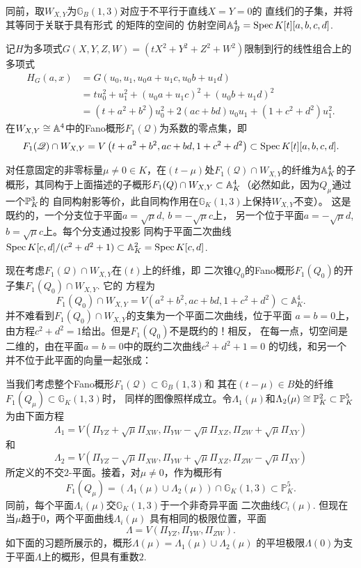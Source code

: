 同前，取$W_{X,Y}$为$\mathbb G_{B}(1,3)$对应于不平行于直线$X=Y=0$的
直线们的子集，并将其等同于关联于具有形式 \theequation 的矩阵的空间的
仿射空间$\A_B^4=\spec K[t][a,b,c,d]$.

记$H$为多项式$G(X,Y,Z,W)=(tX^2+Y^2+Z^2+W^2)$限制到行的线性组合上的
多项式
\[
\begin{aligned} 
	H_{G}(a, x) &=G\left(u_{0}, u_{1}, u_{0} a+u_{1} c, u_{0} b+u_{1} d\right) \\ &=t u_{0}^{2}+u_{1}^{2}+\left(u_{0} a+u_{1} c\right)^{2}+\left(u_{0} b+u_{1} d\right)^{2} \\ &=\left(t+a^{2}+b^{2}\right) u_{0}^{2}+2(a c+b d) u_{0} u_{1}+\left(1+c^{2}+d^{2}\right) u_{1}^{2}. 
\end{aligned}
\]
在$W_{X,Y}\cong \A^4$中的Fano概形$F_1(\mathscr Q)$为系数的零点集，即
\[
	F_{1}(\mathscr{Q}) \cap W_{X, Y}=V\left(t+a^{2}+b^{2}, a c+b d, 1+c^{2}+d^{2}\right) \subset \spec K[t][a, b, c, d].
\]


对任意固定的非零标量$\mu\neq 0\in K$，在$(t-\mu)$处$F_1(\mathscr Q)
\cap W_{X,Y}$的纤维为$\A_K^4$的子概形，其同构于上面描述的子概形$F_1(Q)
\cap W_{X,Y}\subset \A_K^4$（必然如此，因为$Q_\mu$通过一个$\P_K^3$的
自同构射影等价，此自同构作用在$\mathbb G_K(1,3)$上保持$W_{X,Y}$不变）。
这是既约的，一个分支位于平面$a=\sqrt{\mu}d$, $b=-\sqrt{\mu}c$上，
另一个位于平面$a=-\sqrt{\mu}d$, $b=\sqrt{\mu}c$上。每个分支通过投影
同构于平面二次曲线$\spec K[c,d]/(c^2+d^2+1)\subset \A_K^2=\spec K[c,d]$.

现在考虑$F_1(\mathscr Q)\cap W_{X,Y}$在$(t)$上的纤维，即
二次锥$Q_0$的Fano概形$F_1(Q_0)$的开子集$F_1(Q_0)\cap W_{X,Y}$. 它的
方程为
\[
	F_{1}\left(Q_{0}\right) \cap W_{X, Y}=V\left(a^{2}+b^{2}, a c+b d, 1+c^{2}+d^{2}\right) \subset \mathbb{A}_{K}^{4}.
\]
并不难看到$F_1(Q_0)\cap W_{X,Y}$的支集为一个平面二次曲线，位于平面
$a=b=0$上，由方程$c^2+d^2=1$给出。但是$F_1(Q_0)$不是既约的！相反，
在每一点，切空间是二维的，由在平面$a=b=0$中的既约二次曲线$c^2+d^2+1=0$
的切线，和另一个并不位于此平面的向量一起张成：

当我们考虑整个Fano概形$F_1(\mathscr Q)\subset \mathbb G_B(1,3)$和
其在$(t-\mu)\in B$处的纤维$F_1(Q_\mu)\subset \mathbb G_K(1,3)$时，
同样的图像照样成立。令$\Lambda_1(\mu)$和$\Lambda_2(\mu)\cong \P_K^2
\subset \P_K^5$为由下面方程
\[
	\Lambda_{1}=V\left(\Pi_{Y Z}+\sqrt{\mu} \Pi_{X W}, \Pi_{Y W}-\sqrt{\mu} \Pi_{X Z}, \Pi_{Z W}+\sqrt{\mu} \Pi_{X Y}\right)
\]
和
\[
	\Lambda_{2}=V\left(\Pi_{Y Z}-\sqrt{\mu} \Pi_{X W}, \Pi_{Y W}+\sqrt{\mu} \Pi_{X Z}, \Pi_{Z W}-\sqrt{\mu} \Pi_{X Y}\right)
\]
所定义的不交$2$-平面。接着，对$\mu\neq 0$，作为概形有
\[
	F_{1}\left(Q_{\mu}\right)=\left(\Lambda_{1}(\mu) \cup \Lambda_{2}(\mu)\right) \cap \mathbb{G}_{K}(1,3) \subset \mathbb{P}_{K}^{5}.
\]%
%
%
同前，每个平面$\Lambda_i(\mu)$交$\mathbb G_K(1,3)$于一个非奇异平面
二次曲线$C_i(\mu)$. 但现在当$\mu$趋于$0$，两个平面曲线$\Lambda_i(\mu)$
具有相同的极限位置，平面
\[
	\Lambda=V\left(\Pi_{Y Z}, \Pi_{Y W}, \Pi_{Z W}\right).
\]
如下面的习题所展示的，概形$\Lambda(\mu)=\Lambda_1(\mu)\cup \Lambda_2(\mu)$
的平坦极限$\Lambda(0)$为支于平面$\Lambda$上的概形，但具有重数$2$.

